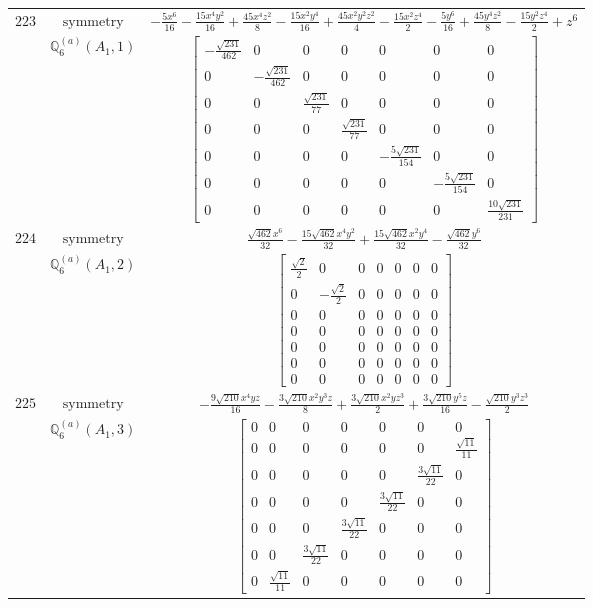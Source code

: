 \documentclass[fleqn,8pt,landscape]{jsarticle}
\begin{document}
\begin{longtable}{ccc}
$ 223 $ & $ \text{symmetry} $ & $ - \frac{5 x^{6}}{16} - \frac{15 x^{4} y^{2}}{16} + \frac{45 x^{4} z^{2}}{8} - \frac{15 x^{2} y^{4}}{16} + \frac{45 x^{2} y^{2} z^{2}}{4} - \frac{15 x^{2} z^{4}}{2} - \frac{5 y^{6}}{16} + \frac{45 y^{4} z^{2}}{8} - \frac{15 y^{2} z^{4}}{2} + z^{6} $ \\
$  $ & $ \mathbb{Q}_{6}^{(a)}(A_{1},1) $ & $ \begin{bmatrix} - \frac{\sqrt{231}}{462} & 0 & 0 & 0 & 0 & 0 & 0 \\ 0 & - \frac{\sqrt{231}}{462} & 0 & 0 & 0 & 0 & 0 \\ 0 & 0 & \frac{\sqrt{231}}{77} & 0 & 0 & 0 & 0 \\ 0 & 0 & 0 & \frac{\sqrt{231}}{77} & 0 & 0 & 0 \\ 0 & 0 & 0 & 0 & - \frac{5 \sqrt{231}}{154} & 0 & 0 \\ 0 & 0 & 0 & 0 & 0 & - \frac{5 \sqrt{231}}{154} & 0 \\ 0 & 0 & 0 & 0 & 0 & 0 & \frac{10 \sqrt{231}}{231} \end{bmatrix} $ \\ \hline
$ 224 $ & $ \text{symmetry} $ & $ \frac{\sqrt{462} x^{6}}{32} - \frac{15 \sqrt{462} x^{4} y^{2}}{32} + \frac{15 \sqrt{462} x^{2} y^{4}}{32} - \frac{\sqrt{462} y^{6}}{32} $ \\
$  $ & $ \mathbb{Q}_{6}^{(a)}(A_{1},2) $ & $ \begin{bmatrix} \frac{\sqrt{2}}{2} & 0 & 0 & 0 & 0 & 0 & 0 \\ 0 & - \frac{\sqrt{2}}{2} & 0 & 0 & 0 & 0 & 0 \\ 0 & 0 & 0 & 0 & 0 & 0 & 0 \\ 0 & 0 & 0 & 0 & 0 & 0 & 0 \\ 0 & 0 & 0 & 0 & 0 & 0 & 0 \\ 0 & 0 & 0 & 0 & 0 & 0 & 0 \\ 0 & 0 & 0 & 0 & 0 & 0 & 0 \end{bmatrix} $ \\ \hline
$ 225 $ & $ \text{symmetry} $ & $ - \frac{9 \sqrt{210} x^{4} y z}{16} - \frac{3 \sqrt{210} x^{2} y^{3} z}{8} + \frac{3 \sqrt{210} x^{2} y z^{3}}{2} + \frac{3 \sqrt{210} y^{5} z}{16} - \frac{\sqrt{210} y^{3} z^{3}}{2} $ \\
$  $ & $ \mathbb{Q}_{6}^{(a)}(A_{1},3) $ & $ \begin{bmatrix} 0 & 0 & 0 & 0 & 0 & 0 & 0 \\ 0 & 0 & 0 & 0 & 0 & 0 & \frac{\sqrt{11}}{11} \\ 0 & 0 & 0 & 0 & 0 & \frac{3 \sqrt{11}}{22} & 0 \\ 0 & 0 & 0 & 0 & \frac{3 \sqrt{11}}{22} & 0 & 0 \\ 0 & 0 & 0 & \frac{3 \sqrt{11}}{22} & 0 & 0 & 0 \\ 0 & 0 & \frac{3 \sqrt{11}}{22} & 0 & 0 & 0 & 0 \\ 0 & \frac{\sqrt{11}}{11} & 0 & 0 & 0 & 0 & 0 \end{bmatrix} $ \\ \hline

\end{longtable}
\end{document}
